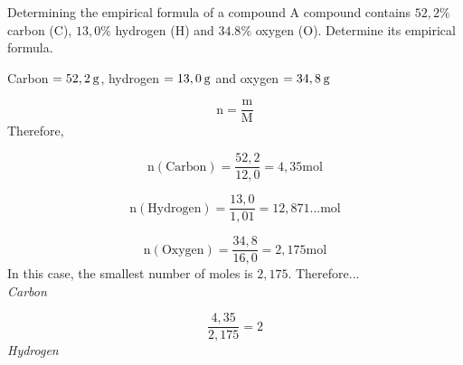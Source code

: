     \noindent
\label{m38712*secfhsst!!!underscore!!!id1029}\vspace{-1cm} 
      \noindent 
      \begin{wex}{Determining the empirical formula of a compound }{
      \label{m38712*probfhsst!!!underscore!!!id1030}
      \label{m38712*id280897}A compound contains $52,2\%$ carbon ($\text{C}$), $13,0\%$ hydrogen ($\text{H}$) and $34.8\%$ oxygen ($\text{O}$). Determine its empirical formula. 
      \vspace{5pt}
}
{ %
      \label{m38712*id280928}Carbon $=52,2\phantom{\rule{2pt}{0ex}}\text{g}$, hydrogen $=13,0\phantom{\rule{2pt}{0ex}}\text{g}$ and oxygen $=34,8\phantom{\rule{2pt}{0ex}}\text{g}$ 
      \label{m38712*id280954}\nopagebreak\noindent{}
        
    \begin{equation*}
    \text{n}=\frac{\text{m}}{\text{M}}
      \end{equation*}
      \label{m38712*id280975}Therefore, 
      \label{m38712*id280978}\nopagebreak\noindent{}
        
    \begin{equation*}
    \text{n}\left(\text{Carbon}\right)=\frac{52,2}{12,0}=4,35\text{mol}
      \end{equation*}
      \label{m38712*id281042}\nopagebreak\noindent{}
        
    \begin{equation*}
    \text{n}\left(\text{Hydrogen}\right)=\frac{13,0}{1,01}=12,871...\text{mol}
      \end{equation*}
      \label{m38712*id281111}\nopagebreak\noindent{}
        
    \begin{equation*}
    \text{n}\left(\text{Oxygen}\right)=\frac{34,8}{16,0}=2,175\text{mol}
      \end{equation*}
In this case, the smallest number of moles is $2,175$. Therefore... \\ 
      \label{m38712*id281179}
        \textsl{Carbon}
 
      \label{m38712*id281185}\nopagebreak\noindent{}
        
    \begin{equation*}
    \frac{4,35}{2,175}=2
      \end{equation*}
      \label{m38712*id281217}
        \textsl{Hydrogen}
     
}
\end{wex}
